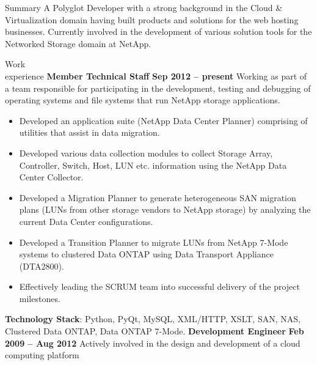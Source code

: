 \documentclass{resume}
\author{Sreejith Kesavan}
\begin{document}
\maketitle

\begin{category}{Summary}
  \citemnobullet A Polyglot Developer with a strong background in the Cloud \& Virtualization 
  domain having built products and solutions for the web hosting businesses. 
  Currently involved in the development of various solution tools for the 
  Networked Storage domain at NetApp.
\end{category}


\begin{category}{Work \\experience}
  \citemnobullet \textbf{Member Technical Staff} \hfill \textbf{Sep 2012 -- present}
  \citemnobullet Working as part of a team responsible for participating in the development, 
  testing and debugging of operating systems and file systems that run NetApp storage applications.
  \begin{itemize}
  \item Developed an application suite (NetApp Data Center Planner) comprising of utilities that 
  assist in data migration.
  \item Developed various data collection modules to collect Storage Array, Controller, Switch, Host, 
  LUN etc. information using the NetApp Data Center Collector.
  \item Developed a Migration Planner to generate heterogeneous SAN migration plans (LUNs from 
  other storage vendors to NetApp storage) by analyzing the current Data Center configurations.
  \item Developed a Transition Planner to migrate LUNs from NetApp 7-Mode systems to clustered
  Data ONTAP using Data Transport Appliance (DTA2800).
  \item Effectively leading the SCRUM team into successful delivery of the project milestones.
  \end{itemize}
  \citemnobullet \textbf{Technology Stack}: Python, PyQt, MySQL,
  XML/HTTP, XSLT, SAN, NAS, Clustered Data ONTAP, Data ONTAP 7-Mode.
  \citemnobullet \textbf{Development Engineer} \hfill \textbf{Feb 2009 -- Aug 2012}
  \citemnobullet Actively involved in the design and development of a cloud computing platform 

\end{category}
\end{document}
